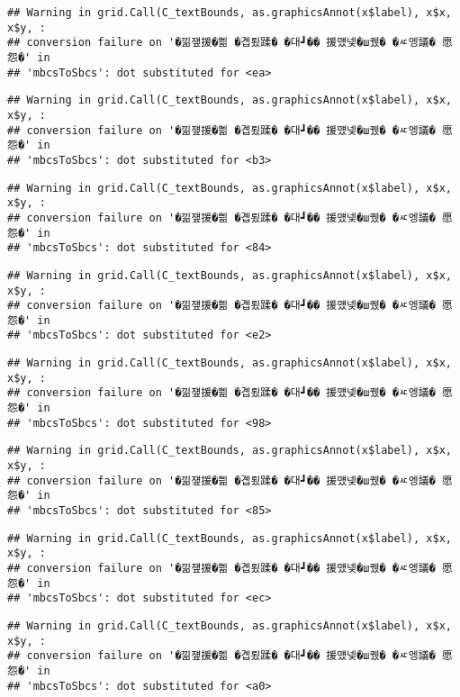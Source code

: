 \documentclass[
]{article}
\begin{document}
\begin{verbatim}
## Warning in grid.Call(C_textBounds, as.graphicsAnnot(x$label), x$x, x$y, :
## conversion failure on '�낆쟾援�쁾 �곕룄蹂� �대┛�� 援먰넻�ш퀬� �ㅼ엥議� 愿怨�' in
## 'mbcsToSbcs': dot substituted for <ea>
\end{verbatim}

\begin{verbatim}
## Warning in grid.Call(C_textBounds, as.graphicsAnnot(x$label), x$x, x$y, :
## conversion failure on '�낆쟾援�쁾 �곕룄蹂� �대┛�� 援먰넻�ш퀬� �ㅼ엥議� 愿怨�' in
## 'mbcsToSbcs': dot substituted for <b3>
\end{verbatim}

\begin{verbatim}
## Warning in grid.Call(C_textBounds, as.graphicsAnnot(x$label), x$x, x$y, :
## conversion failure on '�낆쟾援�쁾 �곕룄蹂� �대┛�� 援먰넻�ш퀬� �ㅼ엥議� 愿怨�' in
## 'mbcsToSbcs': dot substituted for <84>
\end{verbatim}

\begin{verbatim}
## Warning in grid.Call(C_textBounds, as.graphicsAnnot(x$label), x$x, x$y, :
## conversion failure on '�낆쟾援�쁾 �곕룄蹂� �대┛�� 援먰넻�ш퀬� �ㅼ엥議� 愿怨�' in
## 'mbcsToSbcs': dot substituted for <e2>
\end{verbatim}

\begin{verbatim}
## Warning in grid.Call(C_textBounds, as.graphicsAnnot(x$label), x$x, x$y, :
## conversion failure on '�낆쟾援�쁾 �곕룄蹂� �대┛�� 援먰넻�ш퀬� �ㅼ엥議� 愿怨�' in
## 'mbcsToSbcs': dot substituted for <98>
\end{verbatim}

\begin{verbatim}
## Warning in grid.Call(C_textBounds, as.graphicsAnnot(x$label), x$x, x$y, :
## conversion failure on '�낆쟾援�쁾 �곕룄蹂� �대┛�� 援먰넻�ш퀬� �ㅼ엥議� 愿怨�' in
## 'mbcsToSbcs': dot substituted for <85>
\end{verbatim}

\begin{verbatim}
## Warning in grid.Call(C_textBounds, as.graphicsAnnot(x$label), x$x, x$y, :
## conversion failure on '�낆쟾援�쁾 �곕룄蹂� �대┛�� 援먰넻�ш퀬� �ㅼ엥議� 愿怨�' in
## 'mbcsToSbcs': dot substituted for <ec>
\end{verbatim}

\begin{verbatim}
## Warning in grid.Call(C_textBounds, as.graphicsAnnot(x$label), x$x, x$y, :
## conversion failure on '�낆쟾援�쁾 �곕룄蹂� �대┛�� 援먰넻�ш퀬� �ㅼ엥議� 愿怨�' in
## 'mbcsToSbcs': dot substituted for <a0>
\end{verbatim}
\end{document}
